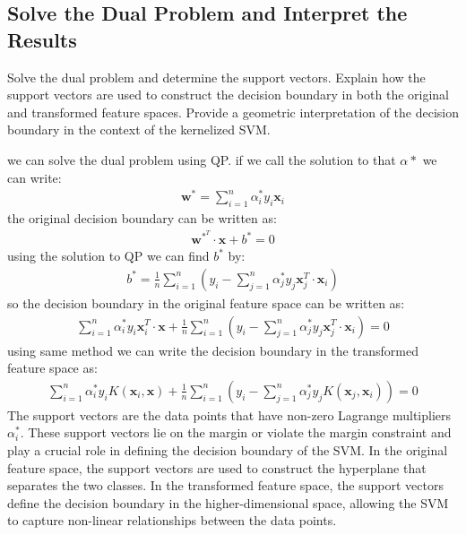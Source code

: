 \subsection{Solve the Dual Problem and Interpret the Results}
Solve the dual problem and determine the support vectors. Explain how the support vectors are used to construct the decision boundary in both the original and transformed feature spaces. Provide a geometric interpretation of the decision boundary in the context of the kernelized SVM.
\begin{qsolve}
    \begin{qsolve}[]
        we can solve the dual problem using QP. if we call the solution to that $\alpha*$ we can write:
        \begin{align*}
            \mathbf{w}^* = \sum_{i=1}^{n} \alpha_i^* y_i \mathbf{x}_i
        \end{align*}
        the original decision boundary can be written as:
        \begin{align*}
            \mathbf{w}^{*^T} \cdot \mathbf{x} + b^* = 0
        \end{align*}
        using the solution to QP we can find $b^*$ by:
        \begin{align*}
            b^* = \frac{1}{n} \sum_{i=1}^{n} \left( y_i - \sum_{j=1}^{n} \alpha_j^* y_j \mathbf{x}_j^T \cdot \mathbf{x}_i \right)
        \end{align*}
        so the decision boundary in the original feature space can be written as:
        \begin{align*}
            \sum_{i=1}^{n} \alpha_i^* y_i \mathbf{x}_i^T \cdot \mathbf{x} + \frac{1}{n} \sum_{i=1}^{n} \left( y_i - \sum_{j=1}^{n} \alpha_j^* y_j \mathbf{x}_j^T \cdot \mathbf{x}_i \right) = 0
        \end{align*}
        using same method we can write the decision boundary in the transformed feature space as:
        \begin{align*}
            \sum_{i=1}^{n} \alpha_i^* y_i K(\mathbf{x}_i, \mathbf{x}) + \frac{1}{n} \sum_{i=1}^{n} \left( y_i - \sum_{j=1}^{n} \alpha_j^* y_j K(\mathbf{x}_j, \mathbf{x}_i) \right) = 0
        \end{align*}
        The support vectors are the data points that have non-zero Lagrange multipliers $\alpha_i^*$. These support vectors lie on the margin or violate the margin constraint and play a crucial role in defining the decision boundary of the SVM.
        \splitqsolve[\splitqsolve]
        In the original feature space, the support vectors are used to construct the hyperplane that separates the two classes. In the transformed feature space, the support vectors define the decision boundary in the higher-dimensional space, allowing the SVM to capture non-linear relationships between the data points.
    \end{qsolve}
\end{qsolve}